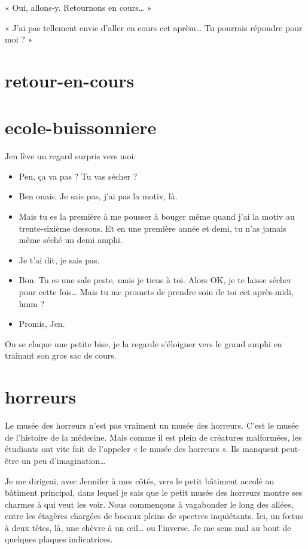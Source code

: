 \item « Oui, allons-y. Retournons en cours… » 
\item « J'ai pas tellement envie d'aller en cours cet aprèm… Tu pourrais répondre pour moi ? » 
\enw

\section{retour-en-cours}



\section{ecole-buissonniere}

Jen lève un regard surpris vers moi.

\begin{itemize}
\item Pen, ça va pas ? Tu vas sécher ?
\item Ben ouais. Je sais pas, j'ai pas la motiv, là.
\item Mais tu es la première à me pousser à bouger même quand j'ai la motiv au trente-sixième dessous. Et en une première année et demi, tu n'as jamais même séché un demi amphi.
\item Je t'ai dit, je sais pas.
\item Bon. Tu es une sale peste, mais je tiens à toi. Alors OK, je te laisse sécher pour cette fois… Mais tu me promets de prendre soin de toi cet après-midi, hmm ?
\item Promis, Jen.
\end{itemize}

On se claque une petite bise, je la regarde s'éloigner vers le grand amphi en traînant son gros sac de cours.

\section{horreurs}

Le musée des horreurs n'est pas vraiment un musée des horreurs. C'est le musée de l'histoire de la médecine. Mais comme il est plein de créatures malformées, les étudiants ont vite fait de l'appeler « le musée des horreurs ». Ils manquent peut-être un peu d'imagination…

Je me dirigeai, avec Jennifer à mes côtés, vers le petit bâtiment accolé au bâtiment principal, dans lequel je sais que le petit musée des horreurs montre ses charmes à qui veut les voir. Nous commençons à vagabonder le long des allées, entre les étagères chargées de bocaux pleins de spectres inquiétants. Ici, un fœtus à deux têtes, là, une chèvre à un œil… ou l'inverse. Je me sens mal au bout de quelques plaques indicatrices.

